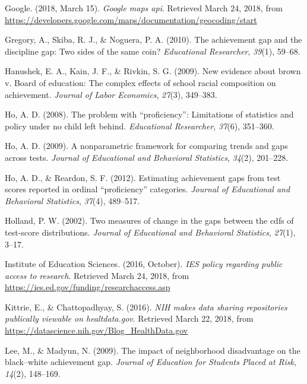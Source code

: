 \documentclass[man, fleqn, noextraspace]{apa6}
\theoremstyle{definition}
\theoremstyle{definition}
\theoremstyle{definition}
\theoremstyle{remark}
\begin{document}
\leavevmode\hypertarget{ref-google}{}%
Google. (2018, March 15). \emph{Google maps api}. Retrieved March 24,
2018, from
\url{https://developers.google.com/maps/documentation/geocoding/start}

\leavevmode\hypertarget{ref-gregory10}{}%
Gregory, A., Skiba, R. J., \& Noguera, P. A. (2010). The achievement gap
and the discipline gap: Two sides of the same coin? \emph{Educational
Researcher}, \emph{39}(1), 59--68.

\leavevmode\hypertarget{ref-hanushek09}{}%
Hanushek, E. A., Kain, J. F., \& Rivkin, S. G. (2009). New evidence
about brown v. Board of education: The complex effects of school racial
composition on achievement. \emph{Journal of Labor Economics},
\emph{27}(3), 349--383.

\leavevmode\hypertarget{ref-ho08}{}%
Ho, A. D. (2008). The problem with ``proficiency'': Limitations of
statistics and policy under no child left behind. \emph{Educational
Researcher}, \emph{37}(6), 351--360.

\leavevmode\hypertarget{ref-ho09}{}%
Ho, A. D. (2009). A nonparametric framework for comparing trends and
gaps across tests. \emph{Journal of Educational and Behavioral
Statistics}, \emph{34}(2), 201--228.

\leavevmode\hypertarget{ref-ho12}{}%
Ho, A. D., \& Reardon, S. F. (2012). Estimating achievement gaps from
test scores reported in ordinal ``proficiency'' categories.
\emph{Journal of Educational and Behavioral Statistics}, \emph{37}(4),
489--517.

\leavevmode\hypertarget{ref-holland02}{}%
Holland, P. W. (2002). Two measures of change in the gaps between the
cdfs of test-score distributions. \emph{Journal of Educational and
Behavioral Statistics}, \emph{27}(1), 3--17.

\leavevmode\hypertarget{ref-ies16}{}%
Institute of Education Sciences. (2016, October). \emph{IES policy
regarding public access to research}. Retrieved March 24, 2018, from
\url{https://ies.ed.gov/funding/researchaccess.asp}

\leavevmode\hypertarget{ref-nih_16}{}%
Kittrie, E., \& Chattopadhyay, S. (2016). \emph{NIH makes data sharing
repositories publically viewable on healtdata.gov}. Retrieved March 22,
2018, from \url{https://datascience.nih.gov/Blog_HealthData.gov}

\leavevmode\hypertarget{ref-lee09}{}%
Lee, M., \& Madyun, N. (2009). The impact of neighborhood disadvantage
on the black--white achievement gap. \emph{Journal of Education for
Students Placed at Risk}, \emph{14}(2), 148--169.
\end{document}
